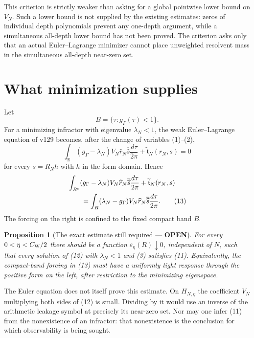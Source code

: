 \documentclass[11pt]{article}
\newcommand{\OPEN}{\textcolor{red!70!black}{\textbf{OPEN}}}
\newtheorem{proposition}{Proposition}
\begin{document}
This criterion is strictly weaker than asking for a global pointwise
lower bound on $V_N$.  Such a lower bound is not supplied by the existing
estimates: zeros of individual depth polynomials prevent any one-depth
argument, while a simultaneous all-depth lower bound has not been proved.
The criterion asks only that an actual Euler--Lagrange minimizer cannot
place unweighted resolvent mass in the simultaneous all-depth near-zero
set.

\section{What minimization supplies}

Let
\[
 B=\{\tau:g_\Gamma(\tau)<1\}.
\]
For a minimizing infractor with eigenvalue $\lambda_N<1$, the weak
Euler--Lagrange equation of v129 becomes, after the change of variables
(1)--(2),
\begin{equation}
 \int_{\mathbb R}(g_\Gamma-\lambda_N)V_N
       \widehat r_N\overline{\widehat s}
       \frac{d\tau}{2\pi}
 +\widetilde{\mathfrak t}_N(r_N,s)=0                    \tag{12}
\end{equation}
for every $s=R_Nh$ with $h$ in the form domain.  Hence
\begin{align}
 &\int_{B^c}(g_\Gamma-\lambda_N)V_N
       \widehat r_N\overline{\widehat s}\frac{d\tau}{2\pi}
 +\widetilde{\mathfrak t}_N(r_N,s)                       \notag\\
 &\qquad=
 \int_B(\lambda_N-g_\Gamma)V_N
       \widehat r_N\overline{\widehat s}\frac{d\tau}{2\pi}.   \tag{13}
\end{align}
The forcing on the right is confined to the fixed compact band $B$.

\begin{proposition}[The exact estimate still required --- \OPEN]
For every $0<\eta<C_{\rm W}/2$ there should be a function
$\varepsilon_\eta(R)\downarrow0$, independent of $N$, such that every
solution of (12) with $\lambda_N<1$ and (3) satisfies (11).
Equivalently, the compact-band forcing in (13) must have a uniformly
tight response through the positive form on the left, after restriction
to the minimizing eigenspace.
\end{proposition}

The Euler equation does not itself prove this estimate.  On
$H_{N,\eta}$ the coefficient $V_N$ multiplying both sides of (12) is
small.  Dividing by it would use an inverse of the arithmetic leakage
symbol at precisely its near-zero set.  Nor may one infer (11) from the
nonexistence of an infractor: that nonexistence is the conclusion for
which observability is being sought.
\end{document}
